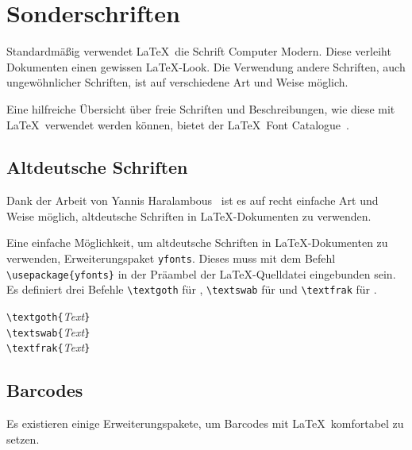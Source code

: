 \documentclass[a4paper,10pt,twoside]{scrbook}
\begin{document}
\chapter{Sonderschriften}

Standardmäßig verwendet \LaTeX\ die Schrift Computer Modern. Diese verleiht 
Dokumenten einen gewissen \glqq\LaTeX-Look\grqq. 
Die Verwendung andere Schriften, auch ungewöhnlicher Schriften, ist auf verschiedene
Art und Weise möglich.

Eine hilfreiche Übersicht über freie Schriften und Beschreibungen, wie diese mit \LaTeX\ verwendet
werden können, bietet der \LaTeX\ Font Catalogue~\cite{LaTeXFontCatalogue}.



\section{Altdeutsche Schriften}

Dank der Arbeit von Yannis Haralambous~\cite{TypesettingOldGermanFonts_Dokumentation} ist es auf recht einfache Art und Weise möglich, altdeutsche Schriften in \LaTeX-Dokumenten zu verwenden.

Eine einfache Möglichkeit, um altdeutsche Schriften in \LaTeX-Dokumenten zu verwenden,
Erweiterungspaket \verb!yfonts!. Dieses muss mit dem Befehl \verb!\usepackage{yfonts}! in der Präambel der \LaTeX-Quelldatei
eingebunden sein. Es definiert drei Befehle 
\verb!\textgoth! 
für , 
\verb!\textswab! 
für 
und \verb!\textfrak! 
für .

\begin{boxedminipage}{\textwidth}
\texttt{\textbackslash textgoth\{}\textsl{Text}\texttt{\}} \\
\texttt{\textbackslash textswab\{}\textsl{Text}\texttt{\}} \\
\texttt{\textbackslash textfrak\{}\textsl{Text}\texttt{\}}
\end{boxedminipage}

\section{Barcodes}

Es existieren einige Erweiterungspakete, um Barcodes mit \LaTeX\ komfortabel zu setzen.
\end{document}
